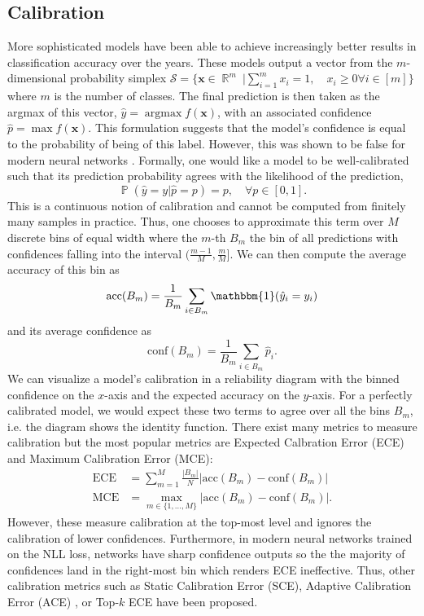 \documentclass[a4paper, 11pt, oneside]{scrartcl}
\theoremstyle{break}
\DeclareMathOperator*{\argmax}{argmax}
\DeclareMathOperator{\Real}{\mathbb{R}}
\DeclareMathOperator{\Prob}{\mathbb{P}}
\newcommand{\matr}[1]{\boldsymbol{#1}}
\newcommand{\set}[1]{\mathcal{#1}}
\numberwithin{equation}{section}
\begin{document}
		\subsection{Calibration}
			More sophisticated models have been able to achieve increasingly better results in classification accuracy over the years.
			These models output a vector from the $m$-dimensional probability simplex $\set{S} = \{\matr{x} \in \Real^m\ | \sum_{i=1}^m x_i = 1, \quad x_i \ge 0 \forall i \in [m]\}$ where $m$ is the number of classes.
			The final prediction is then taken as the argmax of this vector, $\hat{y} = \argmax f(\matr{x})$, with an associated confidence $\hat{p} = \max f(\matr{x})$.
			This formulation suggests that the model's confidence is equal to the probability of being of this label.
			However, this was shown to be false for modern neural networks \parencite{GPS17}.
			Formally, one would like a model to be well-calibrated such that its prediction probability agrees with the likelihood of the prediction,
			\begin{equation}
				\Prob (\hat{y} = y | \hat{p} = p) = p, \quad \forall p \in [0, 1].
				\label{eqn:calibration}
			\end{equation}
			This is a continuous notion of calibration and cannot be computed from finitely many samples in practice.
			Thus, one chooses to approximate this term over $M$ discrete bins of equal width where the $m$-th  $B_m$ the bin of all predictions with confidences falling into the interval $(\frac{m-1}{M}, \frac{m}{M}]$.
			We can then compute the average accuracy of this bin as 
			\begin{equation*}
				\text{acc}(B_m) = \frac{1}{B_m} \sum_{i \in B_m} \mathbbm{1}(\hat{y}_i = y_i)
			\end{equation*}
			and its average confidence as 
			\begin{equation*}
				\text{conf}(B_m) = \frac{1}{B_m} \sum_{i \in B_m} \hat{p}_i.
			\end{equation*}
			We can visualize a model's calibration in a reliability diagram with the binned confidence on the $x$-axis and the expected accuracy on the $y$-axis.
			For a perfectly calibrated model, we would expect these two terms to agree over all the bins $B_m$, i.e. the diagram shows the identity function.
			There exist many metrics to measure calibration but the most popular metrics are Expected Calbration Error (ECE) and Maximum Calibration Error (MCE):
			\begin{align*}
				\text{ECE} &= \sum_{m=1}^M \frac{|B_m|}{N} \left| \text{acc}(B_m) - \text{conf}(B_m) \right| \\
				\text{MCE} &= \max_{m \in \{1, \dots, M\}} \left| \text{acc}(B_m) - \text{conf}(B_m) \right|.
			\end{align*}
			However, these measure calibration at the top-most level and ignores the calibration of lower confidences. 
			Furthermore, in modern neural networks trained on the NLL loss, networks have sharp confidence outputs so the the majority of confidences land in the right-most bin which renders ECE ineffective. 
			Thus, other calibration metrics such as Static Calibration Error (SCE), Adaptive Calibration Error (ACE) \parencite{NDZ+19}, or Top-$k$ ECE \parencite{KOH22} have been proposed.
\end{document}
